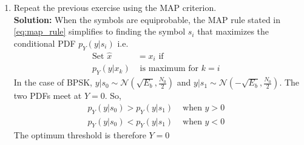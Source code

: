 \documentclass[journal,8pt,onecolumn]{IEEEtran}
\newcommand{\solution}{\noindent \textbf{Solution: }}
\providecommand{\dec}[2]{\ensuremath{\overset{#1}{\underset{#2}{\gtrless}}}}
\providecommand{\gauss}[2]{\mathcal{N}\ensuremath{\left(#1,#2\right)}}
\begin{document}
\begin{enumerate}
\solution The decision rule is
\begin{equation}
y \dec{s_0}{s_1} 0
\end{equation}
\item
Repeat the previous exercise using the MAP criterion.\\
\solution When the symbols are equiprobable, the MAP rule stated in \eqref{eq:map_rule} simplifies to finding the symbol $s_i$ that %
maximizes the conditional PDF $p_Y(y|s_i)$ i.e.
\begin{align}
	\label{eq:mle_rule}
	\text{Set } \hat{x} &= x_i \text{ if}&\\ \nonumber
	p_Y(y|x_k) &\text{ is maximum for } k = i
\end{align}
In the case of BPSK, $y|s_0 \sim \gauss{\sqrt{E_b}}{\frac{N_0}{2}}$ and $y|s_1 \sim \gauss{-\sqrt{E_b}}{\frac{N_0}{2}}$. %
The two PDFs meet at $Y=0$. So,
\begin{align*}
	p_Y(y|s_0) > p_Y(y|s_1) &\text{ when } y > 0&\\
	p_Y(y|s_0) < p_Y(y|s_1) &\text{ when } y < 0 	
\end{align*}
The optimum threshold is therefore $Y=0$


\end{enumerate}
\end{document}
